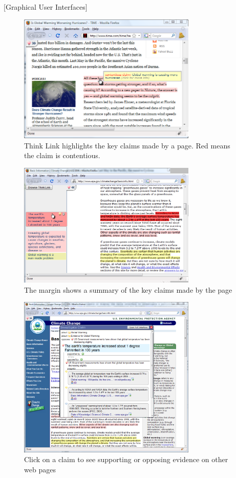 \documentclass{chi2009}
\begin{document}
[Graphical User Interfaces]


\begin{figure}[ht]
	\includegraphics[width=8.5cm]{../screenshots/redhighlight.png}
	\caption{Think Link highlights the key claims made by a page. Red means the claim is contentious.}
	\label{highlight}
\end{figure}

\begin{figure}[ht]
	\includegraphics[width=8.5cm]{../screenshots/sidebar3.png}
	\caption{The margin shows a summary of the key claims made by the page}
	\label{margin}
\end{figure}

\begin{figure}[ht]
	\includegraphics[width=8.5cm]{../screenshots/claim_popup.png}
	\caption{Click on a claim to see supporting or opposing evidence on other web pages}
	\label{claimview}
\end{figure}
\end{document}
